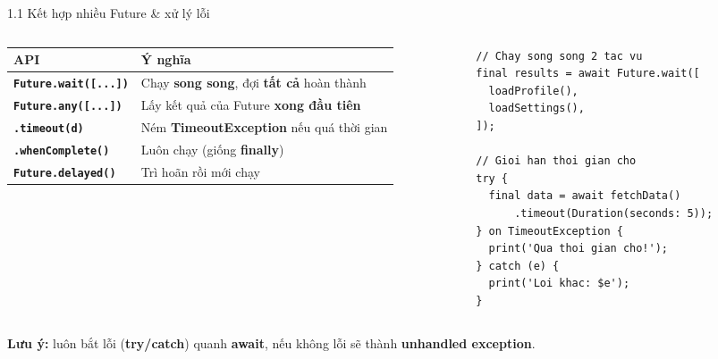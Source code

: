 \documentclass[aspectratio=169,10pt]{beamer}
\newcommand{\api}[1]{\texttt{\bfseries #1}}   %
\begin{document}
\begin{frame}[fragile]{1.1 Kết hợp nhiều Future \& xử lý lỗi}
  \begin{columns}[T]
    \begin{column}{0.52\textwidth}
      \footnotesize
      \renewcommand{\arraystretch}{1.35}
      
      \begin{tabular}{@{}>{\raggedright\arraybackslash}p{2.9cm}>{\raggedright\arraybackslash}p{4.0cm}@{}}
        \hline
        \rowcolor{cHead}
        \textbf{API} & \textbf{Ý nghĩa}\\ \hline
        \api{Future.wait([...])} & Chạy \textbf{song song}, đợi \textbf{tất cả} hoàn thành\\ \hline
        \api{Future.any([...])} & Lấy kết quả của Future \textbf{xong đầu tiên}\\ \hline
        \api{.timeout(d)} & Ném \textbf{TimeoutException} nếu quá thời gian\\ \hline
        \api{.whenComplete()} & Luôn chạy (giống \textbf{finally})\\ \hline
        \api{Future.delayed()} & Trì hoãn rồi mới chạy\\ \hline
      \end{tabular}
    \end{column}
    \begin{column}{0.46\textwidth}
\begin{lstlisting}
// Chay song song 2 tac vu
final results = await Future.wait([
  loadProfile(),
  loadSettings(),
]);

// Gioi han thoi gian cho
try {
  final data = await fetchData()
      .timeout(Duration(seconds: 5));
} on TimeoutException {
  print('Qua thoi gian cho!');
} catch (e) {
  print('Loi khac: $e');
}
\end{lstlisting}
    \end{column}
  \end{columns}
  \vspace{6pt}
  \small \textbf{Lưu ý:} luôn bắt lỗi (\textbf{try/catch}) quanh \textbf{await}, nếu không lỗi sẽ thành \textbf{unhandled exception}.
\end{frame}
\end{document}
